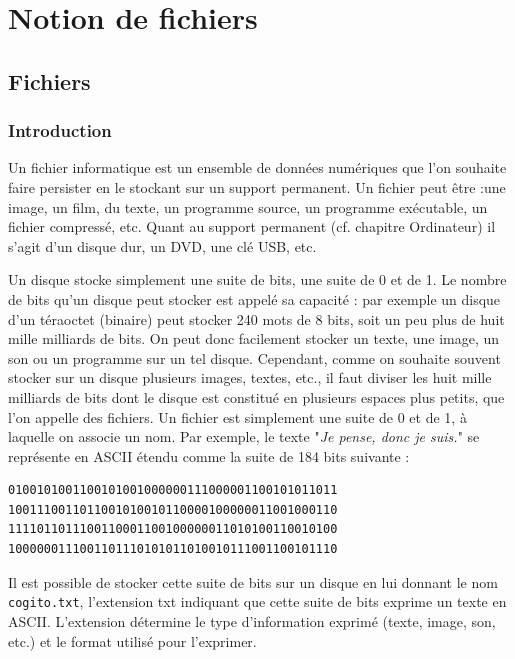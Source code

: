 \documentclass[11pt, a4paper]{book}
\begin{document}
\setcounter{chapter}{3}

\chapter{Notion de fichiers}

\section{Fichiers}
\subsection{Introduction}

Un fichier informatique est un ensemble de données numériques que l'on souhaite faire persister en le stockant sur un support permanent. Un fichier peut être :une image, un film, du texte, un programme source, un programme exécutable, un fichier compressé, etc. Quant au support permanent (cf. chapitre Ordinateur) il s'agit d'un disque dur, un DVD, une clé USB, etc.

Un disque stocke simplement une suite de bits, une suite de 0 et de 1. Le nombre de bits qu’un disque peut stocker est appelé sa capacité : par exemple un disque d’un téraoctet (binaire) peut stocker 240 mots de 8 bits, soit un peu plus de huit mille milliards de bits. On peut donc facilement stocker un texte, une image, un son ou un programme sur un tel disque. Cependant, comme on souhaite souvent stocker sur un disque plusieurs images, textes, etc., il faut diviser les huit mille milliards de bits dont le disque est constitué en plusieurs espaces plus petits, que l’on appelle des fichiers. Un fichier est simplement une suite de 0 et de 1, à laquelle on associe un nom. Par exemple, le texte "\textit{Je pense, donc je suis.}" se représente en ASCII étendu comme la suite de 184 bits suivante :

\begin{verbatim}
0100101001100101001000000111000001100101011011
1001110011011001010010110000100000011001000110
1111011011100110001100100000011010100110010100
1000000111001101110101011010010111001100101110
\end{verbatim}

Il est possible de stocker cette suite de bits sur un disque en lui donnant le nom \texttt{cogito.txt}, l’extension txt indiquant que cette suite de bits exprime un texte en ASCII. L’extension détermine le type d’information exprimé (texte, image, son, etc.) et le format utilisé pour l’exprimer.
\end{document}
